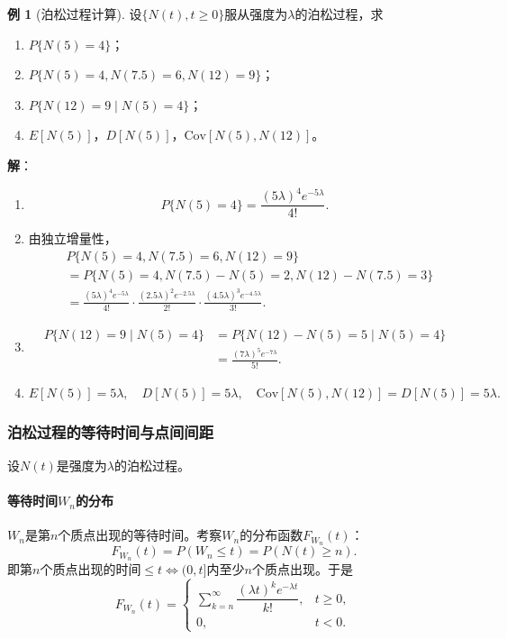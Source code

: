 \documentclass[11pt,a4paper]{report}
\theoremstyle{definition}
\newtheorem{example}{例}[chapter]
\begin{document}
\begin{example}[泊松过程计算]
设$\{N(t),t\geq0\}$服从强度为$\lambda$的泊松过程，求
\begin{enumerate}[label=(\arabic*)]
    \item $P\{N(5)=4\}$；
    \item $P\{N(5)=4,N(7.5)=6,N(12)=9\}$；
    \item $P\{N(12)=9\mid N(5)=4\}$；
    \item $E[N(5)]$，$D[N(5)]$，$\mathrm{Cov}[N(5),N(12)]$。
\end{enumerate}

\textbf{解}：
\begin{enumerate}[label=(\arabic*)]
    \item 
    \[
    P\{N(5)=4\}=\frac{(5\lambda)^4e^{-5\lambda}}{4!}.
    \]
    \item 由独立增量性，
    \begin{align*}
    &P\{N(5)=4,N(7.5)=6,N(12)=9\}\\
    &=P\{N(5)=4,N(7.5)-N(5)=2,N(12)-N(7.5)=3\}\\
    &=\frac{(5\lambda)^4e^{-5\lambda}}{4!}\cdot\frac{(2.5\lambda)^2e^{-2.5\lambda}}{2!}\cdot\frac{(4.5\lambda)^3e^{-4.5\lambda}}{3!}.
    \end{align*}
    \item 
    \begin{align*}
    P\{N(12)=9\mid N(5)=4\}&=P\{N(12)-N(5)=5\mid N(5)=4\}\\
    &=\frac{(7\lambda)^5e^{-7\lambda}}{5!}.
    \end{align*}
    \item 
    \[
    E[N(5)]=5\lambda,\quad D[N(5)]=5\lambda,\quad \mathrm{Cov}[N(5),N(12)]=D[N(5)]=5\lambda.
    \]
\end{enumerate}
\end{example}

\subsubsection{泊松过程的等待时间与点间间距}

设$N(t)$是强度为$\lambda$的泊松过程。

\paragraph{等待时间$W_n$的分布}

$W_n$是第$n$个质点出现的等待时间。考察$W_n$的分布函数$F_{W_n}(t)$：
\[
F_{W_n}(t)=P(W_n\leq t)=P(N(t)\geq n).
\]
即第$n$个质点出现的时间$\leq t\iff(0,t]$内至少$n$个质点出现。于是
\[
F_{W_n}(t)=
\begin{cases}
\sum\limits_{k=n}^{\infty}\dfrac{(\lambda t)^ke^{-\lambda t}}{k!}, & t\geq0,\\[1em]
0, & t<0.
\end{cases}
\]
\end{document}

